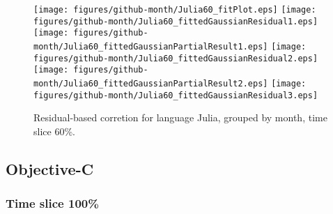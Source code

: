 \begin{figure}[hb]
\centering
{}
{\texttt{[image: figures/github-month/Julia60\_fitPlot.eps]}}
{\texttt{[image: figures/github-month/Julia60\_fittedGaussianResidual1.eps]}}
{\texttt{[image: figures/github-month/Julia60\_fittedGaussianPartialResult1.eps]}}
{\texttt{[image: figures/github-month/Julia60\_fittedGaussianResidual2.eps]}}
{\texttt{[image: figures/github-month/Julia60\_fittedGaussianPartialResult2.eps]}}
{\texttt{[image: figures/github-month/Julia60\_fittedGaussianResidual3.eps]}}
\caption{Residual-based corretion for language Julia, grouped by month, time slice 60\%.}
\end{figure}


\clearpage 
\newpage 


\subsection{Objective-C}

\FloatBarrier

\subsubsection{Time slice 100\%}

